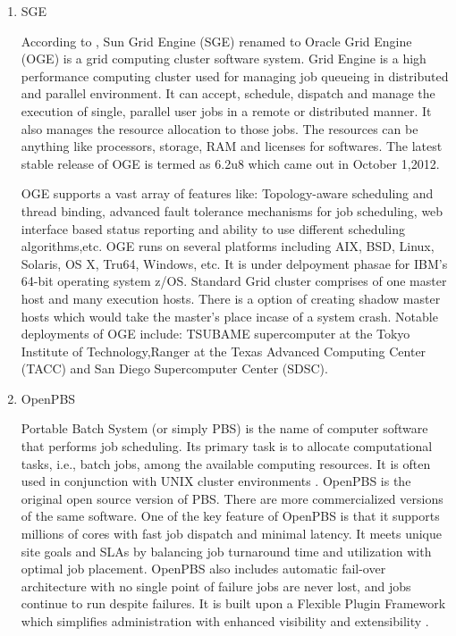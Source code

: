 \begin{enumerate}
\item {} 
SGE

According to \label{\detokenize{i524/technologies:id520}}{\hyperref[\detokenize{i524/technologies:www-sge-wiki}]{\sphinxcrossref{{[}446{]}}}}, Sun Grid Engine (SGE) renamed
to Oracle Grid Engine (OGE) is a grid computing cluster software
system. Grid Engine is a high performance computing cluster used
for managing job queueing in distributed and parallel
environment. It can accept, schedule, dispatch and manage the
execution of single, parallel user jobs in a remote or
distributed manner. It also manages the resource allocation to
those jobs. The resources can be anything like processors,
storage, RAM and licenses for softwares. The latest stable
release of OGE is termed as 6.2u8 which came out in October
1,2012.

OGE supports a vast array of features like: Topology-aware
scheduling and thread binding, advanced fault tolerance
mechanisms for job scheduling, web interface based status
reporting and ability to use different scheduling
algorithms,etc. OGE runs on several platforms including AIX, BSD,
Linux, Solaris, OS X, Tru64, Windows, etc. It is under delpoyment
phasae for IBM's 64-bit operating system z/OS. Standard Grid
cluster comprises of one master host and many execution
hosts. There is a option of creating shadow master hosts which
would take the master's place incase of a system crash. Notable
deployments of OGE include: TSUBAME supercomputer at the Tokyo
Institute of Technology,Ranger at the Texas Advanced Computing
Center (TACC) and San Diego Supercomputer Center (SDSC).

\item {} 
OpenPBS

Portable Batch System (or simply PBS) is the name of computer
software that performs job scheduling. Its primary task is to
allocate computational tasks, i.e., batch jobs, among the
available computing resources. It is often used in conjunction
with UNIX cluster environments \label{\detokenize{i524/technologies:id521}}{\hyperref[\detokenize{i524/technologies:openpbs-wiki}]{\sphinxcrossref{{[}447{]}}}}. OpenPBS is
the original open source version of PBS. There are more
commercialized versions of the same software. One of the key
feature of OpenPBS is that it supports millions of cores with
fast job dispatch and minimal latency. It meets unique site goals
and SLAs by balancing job turnaround time and utilization with
optimal job placement. OpenPBS also includes automatic fail-over
architecture with no single point of failure \textendash{} jobs are never
lost, and jobs continue to run despite failures. It is built upon
a Flexible Plugin Framework which simplifies administration with
enhanced visibility and extensibility \label{\detokenize{i524/technologies:id522}}{\hyperref[\detokenize{i524/technologies:openpbs-www}]{\sphinxcrossref{{[}448{]}}}}.


\end{enumerate}
